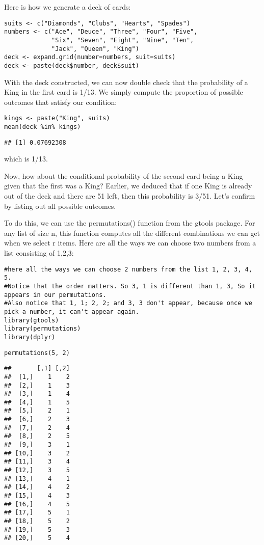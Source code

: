 \documentclass[
]{article}
\begin{document}
Here is how we generate a deck of cards:

\begin{verbatim}
suits <- c("Diamonds", "Clubs", "Hearts", "Spades")
numbers <- c("Ace", "Deuce", "Three", "Four", "Five", 
             "Six", "Seven", "Eight", "Nine", "Ten", 
             "Jack", "Queen", "King")
deck <- expand.grid(number=numbers, suit=suits)
deck <- paste(deck$number, deck$suit)
\end{verbatim}

With the deck constructed, we can now double check that the probability
of a King in the first card is 1/13. We simply compute the proportion of
possible outcomes that satisfy our condition:

\begin{verbatim}
kings <- paste("King", suits)
mean(deck %in% kings)
\end{verbatim}

\begin{verbatim}
## [1] 0.07692308
\end{verbatim}

which is 1/13.

Now, how about the conditional probability of the second card being a
King given that the first was a King? Earlier, we deduced that if one
King is already out of the deck and there are 51 left, then this
probability is 3/51. Let's confirm by listing out all possible outcomes.

To do this, we can use the permutations() function from the gtools
package. For any list of size n, this function computes all the
different combinations we can get when we select r items. Here are all
the ways we can choose two numbers from a list consisting of 1,2,3:

\begin{verbatim}
#here all the ways we can choose 2 numbers from the list 1, 2, 3, 4, 5.
#Notice that the order matters. So 3, 1 is different than 1, 3, So it appears in our permutations.
#Also notice that 1, 1; 2, 2; and 3, 3 don't appear, because once we pick a number, it can't appear again.
library(gtools)
library(permutations)
library(dplyr)
\end{verbatim}

\begin{verbatim}
permutations(5, 2)
\end{verbatim}

\begin{verbatim}
##       [,1] [,2]
##  [1,]    1    2
##  [2,]    1    3
##  [3,]    1    4
##  [4,]    1    5
##  [5,]    2    1
##  [6,]    2    3
##  [7,]    2    4
##  [8,]    2    5
##  [9,]    3    1
## [10,]    3    2
## [11,]    3    4
## [12,]    3    5
## [13,]    4    1
## [14,]    4    2
## [15,]    4    3
## [16,]    4    5
## [17,]    5    1
## [18,]    5    2
## [19,]    5    3
## [20,]    5    4
\end{verbatim}
\end{document}
